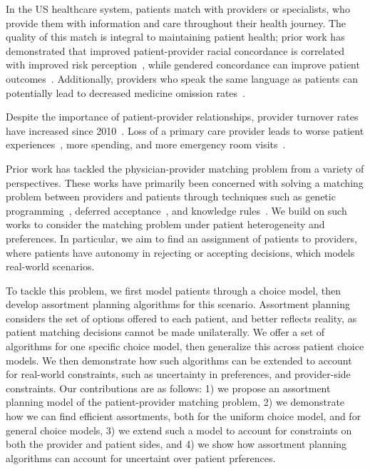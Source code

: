 In the US healthcare system, patients match with providers or specialists, who provide them with information and care throughout their health journey. 
The quality of this match is integral to maintaining patient health; prior work has demonstrated that improved patient-provider racial concordance is correlated with improved risk perception~\cite{race_concordance_lung_cancer}, while gendered concordance can improve patient outcomes~\cite{gender_concordance}. 
Additionally, providers who speak the same language as patients can potentially lead to decreased medicine omission rates~\cite{language_concordance}. 

Despite the importance of patient-provider relationships, provider turnover rates have increased since 2010~\cite{physician_turnover}. 
Loss of a primary care provider leads to worse patient experiences~\cite{pcp_turnover}, more spending, and more emergency room visits~\cite{pcp_turnover_health_outcome}. 

Prior work has tackled the physician-provider matching problem from a variety of perspectives. 
These works have primarily been concerned with solving a matching problem between providers and patients through techniques such as genetic programming~\cite{genetic_algorithm}, deferred acceptance~\cite{deferred_acceptance}, and knowledge rules~\cite{knowledge_rules}. 
We build on such works to consider the matching problem under patient heterogeneity and preferences. 
In particular, we aim to find an assignment of patients to providers, where patients have autonomy in rejecting or accepting decisions, which models real-world scenarios.

To tackle this problem, we first model patients through a choice model, then develop assortment planning algorithms for this scenario. 
Assortment planning considers the set of options offered to each patient, and better reflects reality, as patient matching decisions cannot be made unilaterally. 
We offer a set of algorithms for one specific choice model, then generalize this across patient choice models. 
We then demonstrate how such algorithms can be extended to account for real-world constraints, such as uncertainty in preferences, and provider-side constraints. 
Our contributions are as follows: 1) we propose an assortment planning model of the patient-provider matching problem, 2) we demonstrate how we can find efficient assortments, both for the uniform choice model, and for general choice models, 3) we extend such a model to account for constraints on both the provider and patient sides, and 4) we show how assortment planning algorithms can account for uncertaint over patient prferences. 